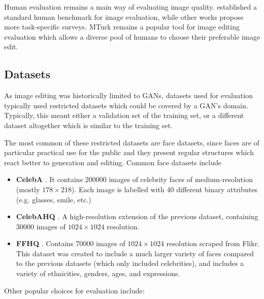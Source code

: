 Human evaluation remains a main way of evaluating image quality.  \cite{hype} 
established a standard human benchmark for image evaluation, while other works propose 
more task-specific surveys. \ac{MTurk} remains a popular tool for image editing 
evaluation which allows a diverse pool of humans to choose their preferable 
image edit. 


\subsection{Datasets}

As image editing was historically limited to \ac{GAN}s, datasets used 
for evaluation typically used restricted datasets which could be covered by 
a \ac{GAN}'s domain. Typically, this meant either a validation set of the training 
set, or a different dataset altogether which is similar to the training set.

The most common of these restricted datasets are face datasets, since faces are 
of particular practical use for the public and they present regular structures which 
react better to generation and editing. Common face datasets
include

\begin{itemize}
      \item \textbf{CelebA} \citep{celeba}. It contains 200000 images of celebrity faces of medium-resolution (mostly $178\times218$). Each image is labelled with 40 different binary attributes (e.g. glasses, smile, etc.)
      \item \textbf{CelebAHQ} \citep{karras2018progressive}. A high-resolution extension of the previous dataset, containing 30000 images of $1024\times1024$ resolution.
      \item \textbf{FFHQ} \citep{karra2019stylegan}. Contains 70000 images of $1024\times1024$ resolution scraped from Flikr. This dataset was created to include a much larger variety of faces compared to the previous datasets (which only included celebrities), and includes a variety of ethnicities, genders, ages, and expressions.
\end{itemize} 

Other popular choices for evaluation  include:

